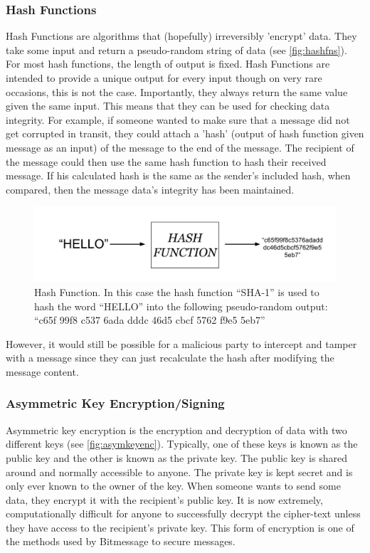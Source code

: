 \documentclass{article}
\begin{document}
\subsubsection{Hash Functions} \label{subsubsec:hashfns}
Hash Functions are algorithms that (hopefully) irreversibly 'encrypt' data. They take some input and return a pseudo-random string of data (see \autoref{fig:hashfns}). For most hash functions, the length of output is fixed. Hash Functions are intended to provide a unique output for every input though on very rare occasions, this is not the case. Importantly, they always return the same value given the same input. This means that they can be used for checking data integrity. For example, if someone wanted to make sure that a message did not get corrupted in transit, they could attach a 'hash' (output of hash function given message as an input) of the message to the end of the message. The recipient of the message could then use the same hash function to hash their received message. If his calculated hash is the same as the sender's included hash, when compared, then the message data's integrity has been maintained.
\begin{figure}[h]
    \centering
    \includegraphics[width=0.8\linewidth]{Images/Diagrams/hash_function.png}
    \caption{Hash Function. In this case the hash function ``SHA-1'' is used to hash the word ``HELLO'' into the following pseudo-random output: ``c65f 99f8 c537 6ada dddc 46d5 cbcf 5762 f9e5 5eb7''}
    \label{fig:hashfns}
\end{figure}

However, it would still be possible for a malicious party to intercept and tamper with a message since they can just recalculate the hash after modifying the message content.

\subsubsection{Asymmetric Key Encryption/Signing}
Asymmetric key encryption is the encryption and decryption of data with two different keys (see \autoref{fig:asymkeyenc}). Typically, one of these keys is known as the public key and the other is known as the private key. The public key is shared around and normally accessible to anyone. The private key is kept secret and is only ever known to the owner of the key. When someone wants to send some data, they encrypt it with the recipient's public key. It is now extremely, computationally difficult for anyone to successfully decrypt the cipher-text unless they have access to the recipient's private key. This form of encryption is one of the methods used by Bitmessage to secure messages. 
\end{document}
